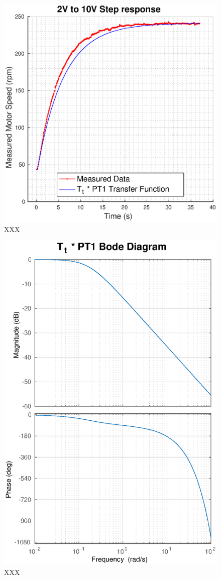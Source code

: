 \begin{figure}
    \centering
    \includegraphics[width=\linewidth]{images/Tt_PT1}
    \caption{XXX}
\end{figure}

\begin{figure}
    \centering
    \includegraphics[width=\linewidth]{images/Tt_PT1_bode}
    \caption{XXX}
\end{figure}
